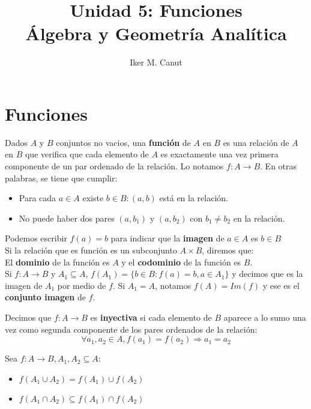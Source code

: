 \documentclass[11pt,a4paper]{article}
\author{Iker M. Canut}
\title{Unidad 5: Funciones\\\'Algebra y Geometr\'ia Anal\'itica}
\begin{document}
\maketitle
\newpage

\section{Funciones}
Dados $A$ y $B$ conjuntos no vacios, una \textbf{funci\'on} de $A$ en $B$ es una relaci\'on de $A$ en $B$ que verifica que cada elemento de $A$ es exactamente una vez primera componente de un par ordenado de la relaci\'on. Lo notamos $f : A \rightarrow B$. En otras palabras, se tiene que cumplir:
\begin{itemize}
\item Para cada $a \in A$ existe $b \in B : (a,b)$ est\'a en la relaci\'on.
\item No puede haber dos pares $(a, b_1)$ y $(a,b_2)$ con $b_1 \not = b_2$ en la relaci\'on.
\end{itemize}
Podemos escribir $f(a) = b$ para indicar que la \textbf{imagen} de $a\in A$ es $b\in B$\\

\noindent Si la relaci\'on que es funci\'on es un subconjunto $A\times B$, diremos que:\\
\indent El \textbf{dominio} de la funci\'on es $A$ y el \textbf{codominio} de la funci\'on es $B$.\\

Si $f : A \rightarrow B$ y $A_1 \subseteq A$,
$f(A_1) = \{ b \in B : f(a) = b, a \in A_1 \}$
y decimos que es la imagen de $A_1$ por medio de $f$. Si $A_1 = A$, notamos $f(A) = Im(f)$ y ese es el \textbf{conjunto imagen} de $f$.

\noindent \dotfill

Decimos que $f : A \rightarrow B$ es \textbf{inyectiva} si cada elemento de $B$ aparece a lo sumo una vez como segunda componente de los pares ordenados de la relaci\'on: $$\forall a_1, a_2 \in A, f(a_1) = f(a_2) \Rightarrow a_1 = a_2$$
\noindent \dotfill

Sea $f:A\rightarrow B, A_1, A_2 \subseteq A$:
\begin{multicols}{2}
\begin{itemize}
\item $f(A_1 \cup A_2) = f(A_1) \cup f(A_2)$
\item $f(A_1 \cap A_2) \subseteq f(A_1) \cap f(A_2)$
\end{itemize}
\end{multicols}
\noindent \dotfill
\end{document}
